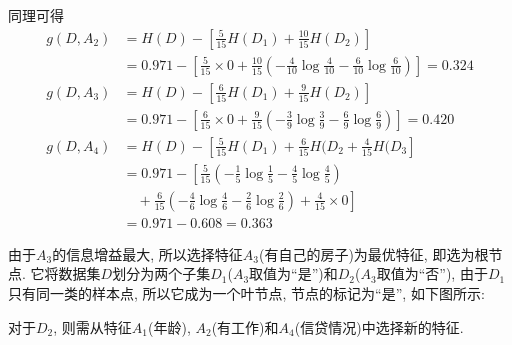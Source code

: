 \documentclass[a4paper,UTF8]{ctexart}
\theoremstyle{plain} \newtheorem{theorem}{定理}[section]
\theoremstyle{plain} \newtheorem{definition}{定义}[section]
\theoremstyle{plain} \newtheorem{lemma}{引理}[section]
\theoremstyle{plain} \newtheorem{proposition}{命题}[section]
\theoremstyle{plain} \newtheorem{example}{例}
\theoremstyle{plain} \newtheorem{remark}{注}
\theoremstyle{plain} \newtheorem{corollary}{推论}[section]
\begin{document}
同理可得
\begin{align*}
g(D, A_{2}) & = H(D) - \left[ \frac{5}{15} H(D_{1}) + \frac{10}{15} H(D_{2}) \right] \\ 
& = 0.971 - \left[ \frac{5}{15} \times 0 + \frac{10}{15} \left( - \frac{4}{10} \log \frac{4}{10} - \frac{6}{10} \log \frac{6}{10}  \right) \right] = 0.324 \\ 
g(D,A_{3}) & = H(D) - \left[ \frac{6}{15} H(D_{1}) + \frac{9}{15} H(D_{2}) \right] \\ 
& = 0.971 - \left[ \frac{6}{15} \times 0 + \frac{9}{15} \left( - \frac{3}{9} \log \frac{3}{9} - \frac{6}{9} \log \frac{6}{9}  \right) \right] = 0.420 \\ 
g(D,A_{4}) & = H(D) - \left[ \frac{5}{15} H(D_{1}) + \frac{6}{15} H(D_{2} + \frac{4}{15} H(D_{3} \right] \\ 
& = 0.971 - \left[ \frac{5}{15} \left( - \frac{1}{5} \log \frac{1}{5} - \frac{4}{5} \log \frac{4}{5} \right) \right. \\ 
& \quad + \left. \frac{6}{15} \left( - \frac{4}{6} \log \frac{4}{6} - \frac{2}{6} \log \frac{2}{6} \right) + \frac{4}{15} \times 0 \right] \\ 
& = 0.971 - 0.608 = 0.363
\end{align*}

由于$A_{3}$的信息增益最大, 所以选择特征$A_{3}$(有自己的房子)为最优特征, 即选为根节点. 它将数据集$D$划分为两个子集$D_{1}$($A_{3}$取值为“是”)和$D_{2}$($A_{3}$取值为“否”), 由于$D_{1}$只有同一类的样本点, 所以它成为一个叶节点, 节点的标记为“是”, 如下图所示:
\begin{figure}[!htb]
\centering
{}
\end{figure}


对于$D_{2}$, 则需从特征$A_{1}$(年龄), $A_{2}$(有工作)和$A_{4}$(信贷情况)中选择新的特征.
\end{document}
